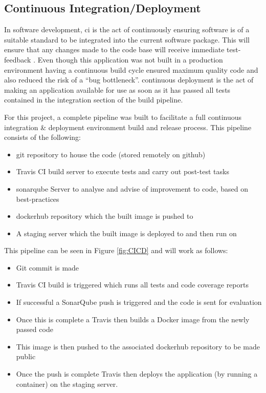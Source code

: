 \subsection{Continuous Integration/Deployment}
\label{sub:ci_cd}
In software development, \gls{ci} is the act of continuously ensuring software is of a suitable standard to be integrated into the current software package. This will ensure that any changes made to the code base will receive immediate test-feedback \citep{Fowler2006}. Even though this application was not built in a production environment having a continuous build cycle ensured maximum quality code and also reduced the risk of a ``bug bottleneck''. \Gls{continuous deployment} is the act of making an application available for use as soon as it has passed all tests contained in the integration section of the build pipeline.

For this project, a complete pipeline was built to facilitate a full continuous integration \& deployment environment build and release process. This pipeline consists of the following:

\begin{itemize}
	\item \gls{git} repository to house the code (stored remotely on \gls{github})
	\item \gls{Travis} CI build server to execute tests and carry out post-test tasks
	\item \gls{sonarqube} Server to analyse and advise of improvement to code, based on best-practices
	\item \gls{dockerhub} repository which the built image is pushed to
	\item A \gls{staging server} which the built image is deployed to and then run on
\end{itemize}

This pipeline can be seen in Figure \ref{fig:CICD} and will work as follows:

\begin{itemize}
	\item Git commit is made
	\item Travis CI build is triggered which runs all tests and \gls{code coverage} reports
	\item If successful a SonarQube push is triggered and the code is sent for evaluation
	\item Once this is complete a Travis then builds a \gls{Docker image} from the newly passed code
	\item This image is then pushed to the associated \gls{dockerhub} repository to be made public
	\item Once the push is complete Travis then deploys the application (by running a container) on the \gls{staging server}.
\end{itemize}

